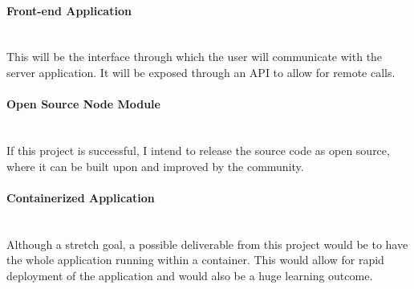 \paragraph{Front-end Application}\mbox{}\\
This will be the interface through which the user will communicate with the server application. It will be exposed through an API to allow for remote calls.

\paragraph{Open Source Node Module}\mbox{}\\
If this project is successful, I intend to release the source code as open source, where it can be built upon and improved by the community.

\paragraph{Containerized Application}\mbox{}\\
Although a stretch goal, a possible deliverable from this project would be to have the whole application running within a container. This would allow for rapid deployment of the application and would also be a huge learning outcome.
